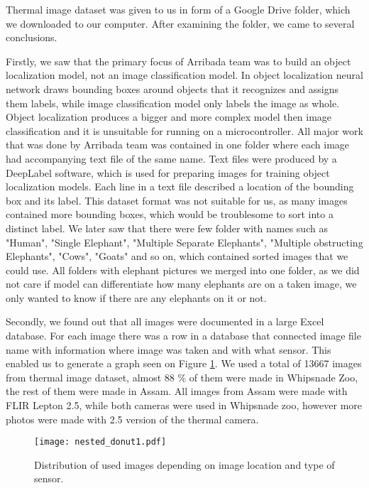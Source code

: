 Thermal image dataset was given to us in form of a Google Drive folder, which we downloaded to our computer.
After examining the folder, we came to several conclusions.

Firstly, we saw that the primary focus of Arribada team was to build an object localization model, not an image classification model.
In object localization neural network draws bounding boxes around objects that it recognizes and assigns them labels, while image classification model only labels the image as whole.
Object localization produces a bigger and more complex model then image classification and it is unsuitable for running on a microcontroller.
All major work that was done by Arribada team was contained in one folder where each image had accompanying text file of the same name.
Text files were produced by a DeepLabel software, which is used for preparing images for training object localization models.
Each line in a text file described a location of the bounding box and its label.
This dataset format was not suitable for us, as many images contained more bounding boxes, which would be troublesome to sort into a distinct label.
We later saw that there were few folder with names such as "Human", "Single Elephant", "Multiple Separate Elephants", "Multiple obstructing Elephants", "Cows", "Goats" and so on, which contained sorted images that we could use.
All folders with elephant pictures we merged into one folder, as we did not care if model can differentiate how many elephants are on a taken image, we only wanted to know if there are any elephants on it or not.

Secondly, we found out that all images were documented in a large Excel database.
For each image there was a row in a database that connected image file name with information where image was taken and with what sensor.
This enabled us to generate a graph seen on Figure \ref{nested_donut1}.
We used a total of 13667 images from thermal image dataset, almost 88 \% of them were made in Whipsnade Zoo, the rest of them were made in Assam.
All images from Assam were made with FLIR Lepton 2.5, while both cameras were used in Whipsnade zoo, however more photos were made with 2.5 version of the thermal camera.

\begin{figure}[ht]
    \centering
    \texttt{[image: nested\_donut1.pdf]} 
    \caption{Distribution of used images depending on image location and type of sensor.}
    \label{nested_donut1}
\end{figure}

